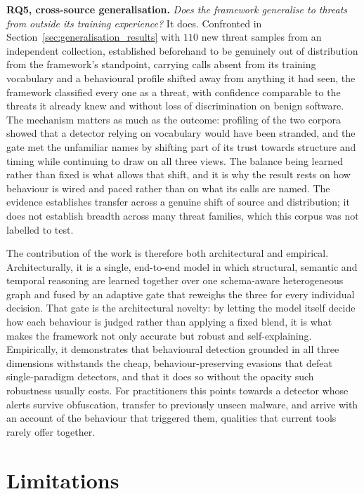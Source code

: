 \documentclass[%
    BCOR=10mm,
    DIV=13,
    toc=bibliography,
    toc=listof,
    oneside,
    12pt,
]{scrbook}
\begin{document}
\textbf{RQ5, cross-source generalisation.} \emph{Does the framework generalise to
threats from outside its training experience?} It does. Confronted in
Section~\ref{sec:generalisation_results} with $110$ new threat samples from an
independent collection, established beforehand to be genuinely out of distribution
from the framework's standpoint, carrying calls absent from its training
vocabulary and a behavioural profile shifted away from anything it had seen, the
framework classified every one as a threat, with confidence comparable to the threats
it already knew and without loss of discrimination on benign software. The mechanism matters as much as the outcome:
profiling of the two corpora showed that a detector relying on vocabulary would have
been stranded, and the gate met the unfamiliar names by shifting part of its trust
towards structure and timing while continuing to draw on all three views. The balance
being learned rather than fixed is what allows that shift, and it is why the result
rests on how behaviour is wired and paced rather than on what its calls are named. The evidence
establishes transfer across a genuine shift of source and distribution; it does not
establish breadth across many threat families, which this corpus was not labelled
to test.

The contribution of the work is therefore both architectural and empirical.
Architecturally, it is a single, end-to-end model in which structural, semantic
and temporal reasoning are learned together over one schema-aware heterogeneous
graph and fused by an adaptive gate that reweighs the three for every individual
decision. That gate is the architectural novelty: by letting the model itself decide
how each behaviour is judged rather than applying a fixed blend, it is what makes the
framework not only accurate but robust and self-explaining. Empirically, it demonstrates that behavioural
detection grounded in all three dimensions withstands the cheap, behaviour-preserving
evasions that defeat single-paradigm detectors, and that it does so without the
opacity such robustness usually costs. For practitioners this points towards a
detector whose alerts survive obfuscation, transfer to previously unseen malware, and
arrive with an account of the behaviour that triggered them, qualities that
current tools rarely offer together.

\section{Limitations}
\label{sec:limitations}
\end{document}

